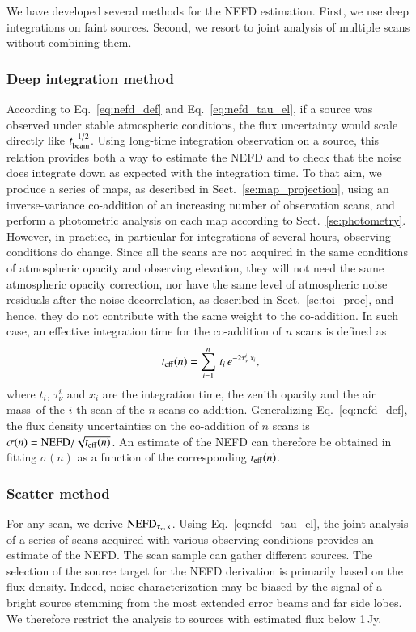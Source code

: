 \documentclass[traditionalabstract]{aa}
\newcommand{\taunu}{\tau_{\nu}}
\newcommand{\airmass}{air mass}
\newcommand{\lp}[1]{#1}
\newcommand{\rev}[1]{#1}
\begin{document}
We have developed several methods for the NEFD estimation. First,
we use deep integrations on faint sources. Second, we resort to joint
analysis of multiple scans without combining them.

\subsubsection{Deep integration method}
According to Eq.~\ref{eq:nefd_def} and Eq.~\ref{eq:nefd_tau_el}, if a
source was observed under stable atmospheric conditions, the flux
uncertainty would scale directly like
$t_{\rm{beam}}^{-1/2}$. Using long-time integration observation on a
source, this relation provides both a way to estimate the NEFD and to
check that the noise does integrate down as expected with the integration
time. To that aim, we produce a series of maps, as described in Sect.~\ref{se:map_projection},
using an inverse-variance co-addition of an increasing number of observation
scans, and perform a photometric analysis on each map according to
Sect.~\ref{se:photometry}. However, in practice, in particular for
integrations of several hours, observing conditions do change.
Since all the scans are not acquired in the same conditions of
atmospheric opacity and observing elevation, {\rev they will not need
the same atmospheric opacity correction, nor have
the same level of atmospheric noise residuals after the noise
decorrelation, as described in Sect.~\ref{se:toi_proc}}, and hence,
they do not contribute with the same weight to
the co-addition. In such case, an effective integration time for the
co-addition of $n$ scans is defined as
%
\begin{equation}
t_{\rm{eff}}(n) = \sum_{i=1}^{n}\, t_i\,  e^{-2\taunu^i\, x_i},
\label{eq:sigma_tau_w8}
\end{equation}
%
where $t_i$, $\taunu^i$ and $x_i$ are the integration time, the zenith
opacity and the \airmass\ of the $i$-th scan of the $n$-scans
co-addition.
Generalizing Eq.~\ref{eq:nefd_def}, the flux density uncertainties on
the co-addition of $n$ scans is $\sigma(n) = \rm{NEFD}/\sqrt{t_{\rm{eff}}(n)}$.
An estimate of the
NEFD can therefore be obtained in fitting
$\sigma(n)$ as a function of the corresponding $t_{\rm{eff}}(n)$.

\subsubsection{Scatter method}
For any scan, we derive $\rm{NEFD}_{\taunu,\, x}$.
Using Eq.~\ref{eq:nefd_tau_el}, the joint analysis of a series of
scans acquired with various observing conditions provides an estimate
of the NEFD. The scan sample can gather different sources. 
The selection of the source target for the NEFD derivation is
primarily based on the flux density. Indeed, noise
characterization may be biased {\lp by the signal of a bright source
stemming from the most extended error beams and far side lobes.}
We therefore restrict the analysis to sources with estimated flux below 1\,Jy.
\end{document}
